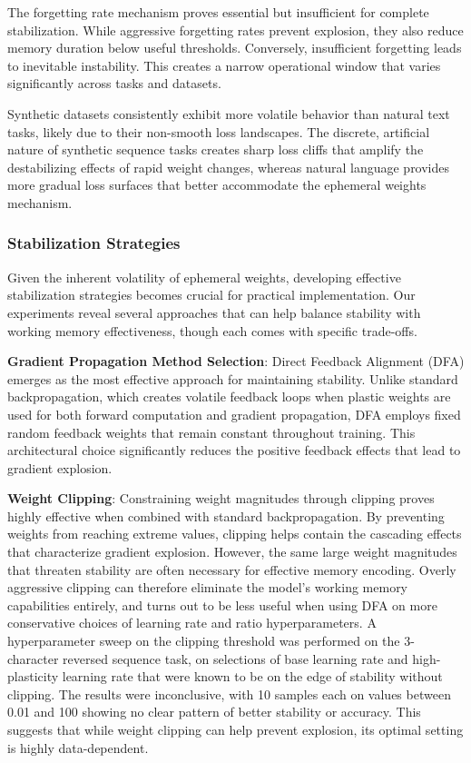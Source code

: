 \documentclass[conference]{IEEEtran}
\begin{document}
The forgetting rate mechanism proves essential but insufficient for complete stabilization. While aggressive forgetting rates prevent explosion, they also reduce memory duration below useful thresholds. Conversely, insufficient forgetting leads to inevitable instability. This creates a narrow operational window that varies significantly across tasks and datasets.

Synthetic datasets consistently exhibit more volatile behavior than natural text tasks, likely due to their non-smooth loss landscapes. The discrete, artificial nature of synthetic sequence tasks creates sharp loss cliffs that amplify the destabilizing effects of rapid weight changes, whereas natural language provides more gradual loss surfaces that better accommodate the ephemeral weights mechanism.

\subsubsection{Stabilization Strategies}

Given the inherent volatility of ephemeral weights, developing effective stabilization strategies becomes crucial for practical implementation. Our experiments reveal several approaches that can help balance stability with working memory effectiveness, though each comes with specific trade-offs.

\textbf{Gradient Propagation Method Selection}: Direct Feedback Alignment (DFA) emerges as the most effective approach for maintaining stability. Unlike standard backpropagation, which creates volatile feedback loops when plastic weights are used for both forward computation and gradient propagation, DFA employs fixed random feedback weights that remain constant throughout training. This architectural choice significantly reduces the positive feedback effects that lead to gradient explosion.

\textbf{Weight Clipping}: Constraining weight magnitudes through clipping proves highly effective when combined with standard backpropagation. By preventing weights from reaching extreme values, clipping helps contain the cascading effects that characterize gradient explosion. However, the same large weight magnitudes that threaten stability are often necessary for effective memory encoding. Overly aggressive clipping can therefore eliminate the model's working memory capabilities entirely, and turns out to be less useful when using DFA on more conservative choices of learning rate and ratio hyperparameters.
A hyperparameter sweep on the clipping threshold was performed on the 3-character reversed sequence task, on selections of base learning rate and high-plasticity learning rate that were known to be on the edge of stability without clipping. The results were inconclusive, with 10 samples each on values between 0.01 and 100 showing no clear pattern of better stability or accuracy. This suggests that while weight clipping can help prevent explosion, its optimal setting is highly data-dependent.
\end{document}
